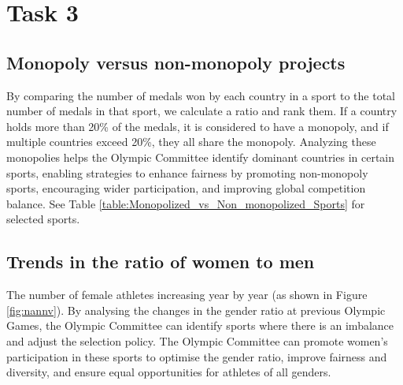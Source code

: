 \documentclass{mcmthesis}
\begin{document}
\section{Task 3}
\subsection{Monopoly versus non-monopoly projects}

By comparing the number of medals won by each country in a sport to the total number of medals in that sport, we calculate a ratio and rank them. If a country holds more than 20\% of the medals, it is considered to have a monopoly, and if multiple countries exceed 20\%, they all share the monopoly. Analyzing these monopolies helps the Olympic Committee identify dominant countries in certain sports, enabling strategies to enhance fairness by promoting non-monopoly sports, encouraging wider participation, and improving global competition balance. See Table \ref{table:Monopolized_vs_Non_monopolized_Sports} for selected sports.

\begin{table}[H]
	\centering
	\caption{Monopolized vs Non-monopolized Sports}
	\label{table:Monopolized_vs_Non_monopolized_Sports}
\end{table}

\subsection{Trends in the ratio of women to men}

  The number of female athletes increasing year by year (as shown in Figure \ref{fig:nannv}). By analysing the changes in the gender ratio at previous Olympic Games, the Olympic Committee can identify sports where there is an imbalance and adjust the selection policy. The Olympic Committee can promote women's participation in these sports to optimise the gender ratio, improve fairness and diversity, and ensure equal opportunities for athletes of all genders.
\end{document}
